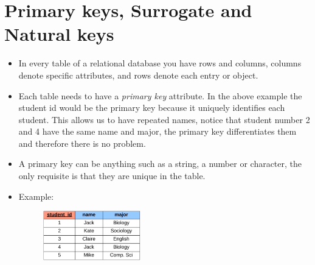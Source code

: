 \section{Primary keys, Surrogate and Natural keys}
\begin{itemize}
    \item In every table of a relational database you have rows and columns, columns denote specific attributes, and rows denote each entry or object.
    \item Each table needs to have a \emph{primary key} attribute. In the above example the student id would be the primary key because it uniquely identifies each student. This allows us to have repeated names, notice that student number 2 and 4 have the same name and major, the primary key differentiates them and therefore there is no problem.
    \item A primary key can be anything such as a string, a number or character, the only requisite is that they are unique in the table.
    \item Example:
        \begin{figure}[H]
            \centering
            \includegraphics[width=0.4\textwidth]{./figs/example.png}
        \end{figure}
\end{itemize}

